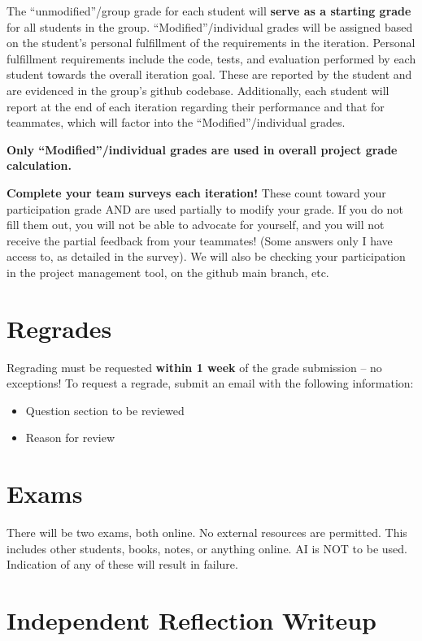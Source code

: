 \documentclass[11pt]{article}
\begin{document}
The ``unmodified''/group grade for each student will \textbf{serve as a starting grade} for all students in the group. ``Modified''/individual grades will be assigned based on the student's personal fulfillment of the requirements in the iteration. Personal fulfillment requirements include the code, tests, and evaluation performed by each student towards the overall iteration goal. These are reported by the student and are evidenced in the group's github codebase. Additionally, each student will report at the end of each iteration regarding their performance and that for teammates, which will factor into the ``Modified''/individual grades.

\textbf{Only ``Modified''/individual grades are used in overall project grade calculation.}

\textbf{Complete your team surveys each iteration!} These count toward your participation grade AND are used partially to modify your grade. If you do not fill them out, you will not be able to advocate for yourself, and you will not receive the partial feedback from your teammates! (Some answers only I have access to, as detailed in the survey). We will also be checking your participation in the project management tool, on the github main branch, etc.

\section*{Regrades}

Regrading must be requested \textbf{within 1 week} of the grade submission -- no exceptions! To request a regrade, submit an email with the following information:
\begin{itemize}
    \item Question section to be reviewed
    \item Reason for review
\end{itemize}

\section*{Exams}

There will be two exams, both online. No external resources are permitted. This includes other students, books, notes, or anything online. AI is NOT to be used. Indication of any of these will result in failure.

\section*{Independent Reflection Writeup}
\end{document}
